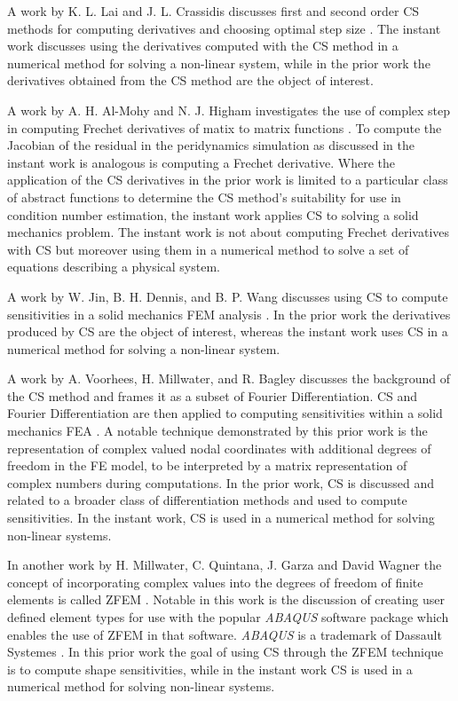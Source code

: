\documentclass[preprint,12pt]{elsarticle}
\begin{document}
A work by  K. L. Lai and J. L. Crassidis discusses first and second order CS
methods for computing derivatives and choosing optimal step size
\cite{lai2008extensions}. The instant work discusses using the derivatives
computed with the CS method in a numerical method for solving a non-linear
system, while in the prior work the derivatives obtained from the CS method 
are the object of interest.

A work by A. H. Al-Mohy and N. J. Higham investigates the use of complex step
in computing Frechet derivatives of matix to matrix functions
\cite{al2010complex}. To compute the Jacobian of the residual in the
peridynamics simulation as discussed in the instant work is analogous is
computing a Frechet derivative. Where the application of the CS derivatives in
the prior work is limited to a particular class of abstract functions to
determine the CS method's suitability for use in condition number estimation, the
instant work applies CS to solving a solid mechanics problem. The instant work is not
about computing Frechet derivatives with CS but moreover using them in a
numerical method to solve a set of equations describing a physical system.

A work by W. Jin, B. H. Dennis, and B. P. Wang discusses using CS to compute
sensitivities in a solid mechanics FEM analysis \cite{jin2010improved}. In the
prior work the derivatives produced by CS are the object of
interest, whereas the instant work uses CS in a numerical method for solving a
non-linear system.

A work by A. Voorhees, H. Millwater, and R. Bagley discusses the background of
the CS method and frames it as a subset of Fourier Differentiation. CS and
Fourier Differentiation are then applied to computing sensitivities within a
solid mechanics FEA \cite{voorhees2011complex}. A notable technique
demonstrated by this prior work is the representation of complex valued nodal
coordinates with additional degrees of freedom in the FE model, to be
interpreted by a matrix representation of complex numbers during computations.
In the prior work, CS is discussed and related to a broader class of
differentiation methods and used to compute sensitivities. In the instant work,
CS is used in a numerical method for solving non-linear systems.

In another work by H. Millwater, C. Quintana, J. Garza and David Wagner the
concept of incorporating complex values into the degrees of freedom of finite
elements is called ZFEM \cite{millwater2013application}. Notable in this work
is the discussion of creating user defined element types for use with the
popular \emph{ABAQUS} software package which enables the use of ZFEM in that
software. \emph{ABAQUS} is a trademark of Dassault Systemes
\cite{systemes2012abaqus}. In this prior work the goal of using CS through the
ZFEM technique is to compute shape sensitivities, while in the instant work CS
is used in a numerical method for solving non-linear systems.
\end{document}
